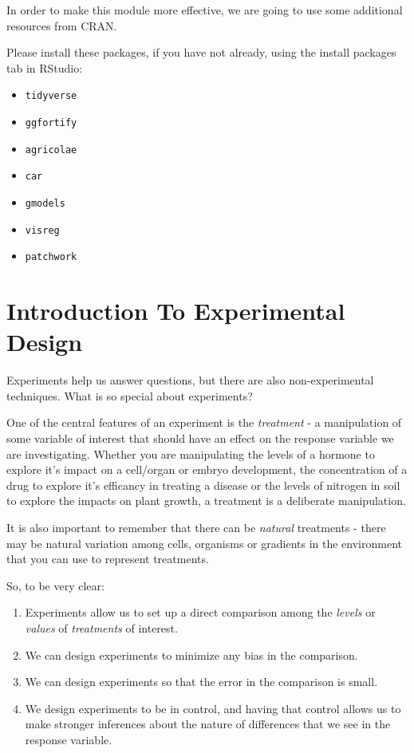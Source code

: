 \documentclass[
]{book}
\providecommand{\tightlist}{%
  \setlength{\itemsep}{0pt}\setlength{\parskip}{0pt}}
\begin{document}
In order to make this module more effective, we are going to use some additional resources from CRAN.

Please install these packages, if you have not already, using the install packages tab in RStudio:

\begin{itemize}
\tightlist
\item
  \texttt{tidyverse}
\item
  \texttt{ggfortify}
\item
  \texttt{agricolae}
\item
  \texttt{car}
\item
  \texttt{gmodels}
\item
  \texttt{visreg}
\item
  \texttt{patchwork}
\end{itemize}

\hypertarget{introduction-to-experimental-design}{%
\chapter{Introduction To Experimental Design}\label{introduction-to-experimental-design}}

Experiments help us answer questions, but there are also non-experimental techniques. What is so special about experiments?

One of the central features of an experiment is the \emph{treatment} - a manipulation of some variable of interest that should have an effect on the response variable we are investigating. Whether you are manipulating the levels of a hormone to explore it's impact on a cell/organ or embryo development, the concentration of a drug to explore it's efficancy in treating a disease or the levels of nitrogen in soil to explore the impacts on plant growth, a treatment is a deliberate manipulation.

It is also important to remember that there can be \emph{natural} treatments - there may be natural variation among cells, organisms or gradients in the environment that you can use to represent treatments.

So, to be very clear:

\begin{enumerate}
\def\labelenumi{\arabic{enumi}.}
\tightlist
\item
  Experiments allow us to set up a direct comparison among the \emph{levels} or \emph{values} of \emph{treatments} of interest.
\item
  We can design experiments to minimize any bias in the comparison.
\item
  We can design experiments so that the error in the comparison is small.
\item
  We design experiments to be in control, and having that control allows us to make stronger inferences about the nature of differences that we see in the response variable.
\end{enumerate}
\end{document}
